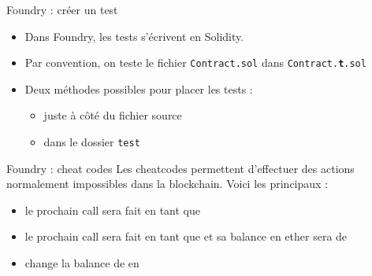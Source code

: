\begin{frame}[fragile]{Foundry : créer un test}
  \begin{itemize}
    \item Dans Foundry, les tests s'écrivent en Solidity.
    \item Par convention, on teste le fichier \texttt{Contract.sol} dans \texttt{Contract.\textbf{t}.sol}
    \item Deux méthodes possibles pour placer les tests :
          \begin{itemize}
            \item juste à côté du fichier source
            \item dans le dossier \texttt{test}
          \end{itemize}
  \end{itemize}
\end{frame}

\begin{frame}[fragile]{Foundry : cheat codes}
  Les cheatcodes permettent d'effectuer des actions normalement impossibles dans la blockchain.
  Voici les principaux :

  \begin{itemize}
    \item {} le prochain call sera fait en tant que 
    \item {} le prochain call sera fait en tant que  et sa balance en ether sera de 
    \item {} change la balance de  en 
  \end{itemize}
\end{frame}